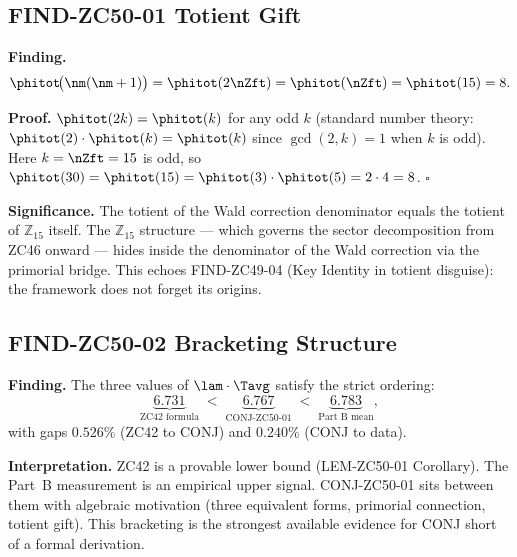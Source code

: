 \documentclass[12pt, a4paper]{article}
\begin{document}
\subsection{FIND-ZC50-01 \quad Totient Gift}


\begin{derivedbox}[title={FIND-ZC50-01: $\varphi(n_m(n_m{+}1)) =
  \varphi(n_{\mathbb{Z}_{15}}) = 8$}]
\textbf{Finding.}
\begin{equation}\label{zc50:eq:totient-gift}
  \phitot\!\bigl(\nm(\nm+1)\bigr) = \phitot(2\nZft)
  = \phitot(\nZft) = \phitot(15) = 8.
\end{equation}

\textbf{Proof.}
$\phitot(2k) = \phitot(k)$ for any odd $k$ (standard number theory:
$\phitot(2)\cdot\phitot(k) = \phitot(k)$ since $\gcd(2,k)=1$ when
$k$ is odd). Here $k = \nZft = 15$ is odd, so
$\phitot(30) = \phitot(15) = \phitot(3)\cdot\phitot(5) = 2\cdot4 = 8$.
\hfill$\square$

\textbf{Significance.}
The totient of the Wald correction denominator equals the totient of
$\mathbb{Z}_{15}$ itself. The $\mathbb{Z}_{15}$ structure --- which
governs the sector decomposition from ZC46 onward --- hides inside
the denominator of the Wald correction via the primorial bridge.
This echoes FIND-ZC49-04 (Key Identity in totient disguise): the
framework does not forget its origins.
\end{derivedbox}

\subsection{FIND-ZC50-02 \quad Bracketing Structure}


\begin{derivedbox}[title={FIND-ZC50-02: ZC42 $<$ CONJ $<$ Data
  (Bracketing)}]
\textbf{Finding.}
The three values of $\lam\cdot\Tavg$ satisfy the strict ordering:
\[
  \underbrace{6.731}_{\text{ZC42 formula}}
  \;<\;
  \underbrace{6.767}_{\text{CONJ-ZC50-01}}
  \;<\;
  \underbrace{6.783}_{\text{Part B mean}},
\]
with gaps $0.526\%$ (ZC42 to CONJ) and $0.240\%$ (CONJ to data).

\textbf{Interpretation.}
ZC42 is a provable lower bound (LEM-ZC50-01 Corollary).
The Part~B measurement is an empirical upper signal.
CONJ-ZC50-01 sits between them with algebraic motivation
(three equivalent forms, primorial connection, totient gift).
This bracketing is the strongest available evidence for CONJ
short of a formal derivation.
\end{derivedbox}
\end{document}
